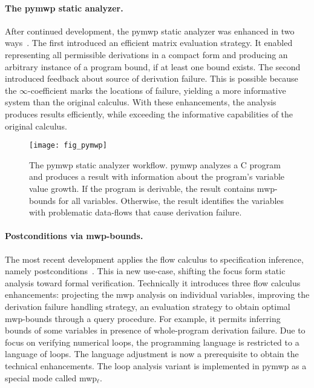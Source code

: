 \paragraph*{The pymwp static analyzer.}
After continued development, the pymwp static analyzer was enhanced in two ways~\cite{aubert2023b}.
The first introduced an efficient matrix evaluation strategy.
It enabled representing all permissible derivations in a compact form and producing an arbitrary instance of a program bound, if at least one bound exists.
The second introduced feedback about source of derivation failure.
This is possible because the \(\infty\)-coefficient marks the locations of failure, yielding a more informative system than the original calculus.
With these enhancements, the analysis produces results efficiently, while exceeding the informative capabilities of the original calculus.

\begin{figure}[t]
\centering
\texttt{[image: fig\_pymwp]}
\caption[pymwp static analyzer operation visualized.]{
The pymwp static analyzer workflow.
pymwp analyzes a C program and produces a result with information about the program's variable value growth.
If the program is derivable, the result contains mwp-bounds for all variables.
Otherwise, the result identifies the variables with problematic data-flows that cause derivation failure.
}\label{fig:pymwp}
\end{figure}

\paragraph*{Postconditions via mwp-bounds.}
The most recent development applies the flow calculus to specification inference, namely postconditions~\cite{rusch2025}.
This ia new use-case, shifting the focus form static analysis toward formal verification.
Technically it introduces three flow calculus enhancements:
projecting the mwp analysis on individual variables, improving the derivation failure handling strategy, an evaluation strategy to obtain optimal mwp-bounds through a query procedure.
For example, it permits inferring bounds of some variables in presence of whole-program derivation failure.
Due to focus on verifying numerical loops, the programming language is restricted to a language of loops.
The language adjustment is now a prerequisite to obtain the technical enhancements.
The loop analysis variant is implemented in pymwp as a special mode called mwp\(_\ell\).

